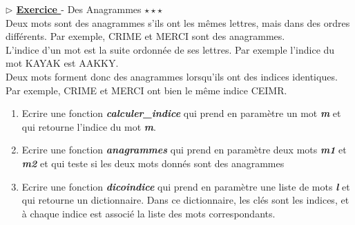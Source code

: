 \documentclass[12pt,french]{article}
\newcounter{npb}
\newcommand{\exo}{
    \stepcounter{npb}
    {\textbf{$\triangleright$ \underline{Exercice \arabic{npb} }}}
}
\begin{document}
\exo -  Des Anagrammes $\star\star\star$\\
Deux mots sont des anagrammes s'ils ont les mêmes lettres, mais dans des ordres différents. Par exemple, CRIME et MERCI sont des anagrammes.\\
L'indice d'un mot est la suite ordonnée de ses lettres. Par exemple l'indice du mot KAYAK est AAKKY.\\
Deux mots forment donc des anagrammes lorsqu'ils ont des indices identiques. Par exemple, CRIME et MERCI ont bien le même indice CEIMR.
\begin{enumerate}
	\item Ecrire une fonction \textbf{\textsl{calculer\_indice}} qui prend en paramètre un mot \textbf{\textsl{m}} et qui retourne l'indice  du mot \textbf{\textsl{m}}.
	\item Ecrire une fonction \textbf{\textsl{anagrammes}} qui prend en paramètre deux mots \textbf{\textsl{m1}} et \textbf{\textsl{m2}} et qui teste si les deux mots donnés sont des anagrammes
	\item Ecrire une fonction \textbf{\textsl{dicoindice}} qui prend en paramètre une liste de mots \textbf{\textsl{l}} et qui retourne un dictionnaire. Dans ce dictionnaire, les clés sont les indices, et à chaque indice est associé la liste des mots correspondants. 
\end{enumerate}
\end{document}
